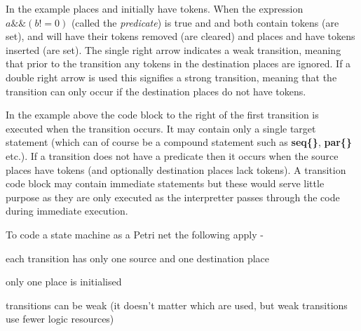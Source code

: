         In the example places  and  initially have tokens. When the
        expression $a \&\& (b != 0)$ (called the {\em predicate}) is true and 
        and  both contain tokens (are set),  and  will have
        their tokens removed (are cleared) and places  and  have tokens
        inserted (are set). The single right arrow indicates a weak transition, meaning
        that prior to the transition any tokens in the destination places are ignored.
        If a double right arrow is used this signifies a strong transition, meaning
        that the transition can only occur if the destination places do not have
        tokens.

        In the example above the code block to the right of the first transition is
        executed when the transition occurs. It may contain
        only a single target statement (which can of course be a compound statement
        such as  {\bf seq\{\}}, {\bf par\{\}} etc.). If a transition does not have a
        predicate then it occurs when the source places have tokens (and optionally
        destination places lack tokens). A transition code block may contain immediate
        statements but these would serve little purpose as they are only executed as the
        interpretter passes through the code during immediate execution.

        To code a state machine as a Petri net the following apply -
        \blist
        \item   each transition has only one source and one destination place
        \item   only one place is initialised
        \item   transitions can be weak (it doesn't matter which are used, but
                weak transitions use fewer logic resources)
        \blend

